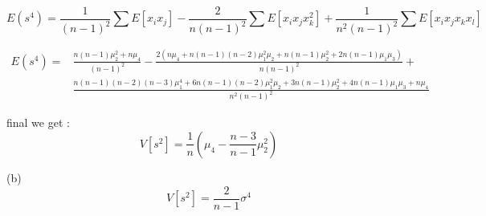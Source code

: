 \documentclass{article}
\begin{document}
\begin{CJK*}{GBK}{song}
\begin{equation}
E(s^4)=\frac{1}{(n-1)^2}\sum E[x_ix_j]-\frac{2}{n(n-1)^2}\sum E[x_ix_jx_k^2]+\frac{1}{n^2(n-1)^2}\sum E[x_ix_jx_kx_l]
\end{equation}

\begin{equation}
\begin{aligned}
E(s^4)=&\frac{n(n-1)\mu_2^2+n\mu_4}{(n-1)^2}-\frac{2(n\mu_4+n(n-1)(n-2)\mu_1^2\mu_2+n(n-1)\mu_2^2+2n(n-1)\mu_1\mu_3)}{n(n-1)^2}+\\
&\frac{n(n-1)(n-2)(n-3)\mu_1^4+6n(n-1)(n-2)\mu_1^2\mu_2+3n(n-1)\mu_2^2+4n(n-1)\mu_1\mu_3+n\mu_4}{n^2(n-1)^2}
\end{aligned}
\end{equation}

final we get :
\begin{equation}
V[s^2]=\frac{1}{n}\left(\mu_4-\frac{n-3}{n-1}\mu_2^2\right)
\end{equation}

(b)
\begin{equation}
V[s^2]=\frac{2}{n-1}\sigma^4
\end{equation}







\end{CJK*}
\end{document}
